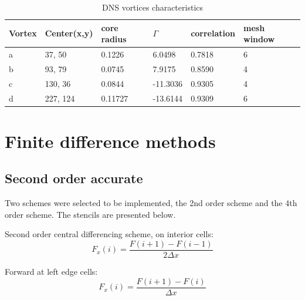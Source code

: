 \documentclass[12pt, a4paper, openany]{memoir}
\begin{document}
\begin{table}[h!]
	\centering
	\caption{DNS vortices characteristics}
	\vspace{10px}
	\label{tb:DNSvortices}
	\begin{tabular}{l|l|l|l|l|l}
		Vortex         & Center(x,y) & core radius    & $\Gamma$   & correlation & mesh window \\
		\hline
		a    & 37, 50   & 0.1226  & 6.0498   & 0.7818 & 6 \\
		b    & 93, 79   & 0.0745  & 7.9175   & 0.8590 & 4 \\
		c    & 130, 36  & 0.0844  & -11.3036 & 0.9305 & 4\\
		d    & 227, 124 & 0.11727 & -13.6144 & 0.9309 & 6
	\end{tabular}
\end{table}
  



\newpage



\appendix

\chapter{Finite difference methods}

\section{Second order accurate}
\label{annex:finite}
Two schemes were selected to be implemented, the 2nd order scheme and the 4th order scheme. The stencils are presented below.

Second order central differencing scheme, on interior cells:
\begin{equation}
F_x(i) = \frac{F(i+1)-F(i-1)}{2 \Delta x}
\end{equation}

Forward at left edge cells:
\begin{equation}
F_x(i) = \frac{F(i+1)-F(i)}{\Delta x}
\end{equation}
\end{document}

